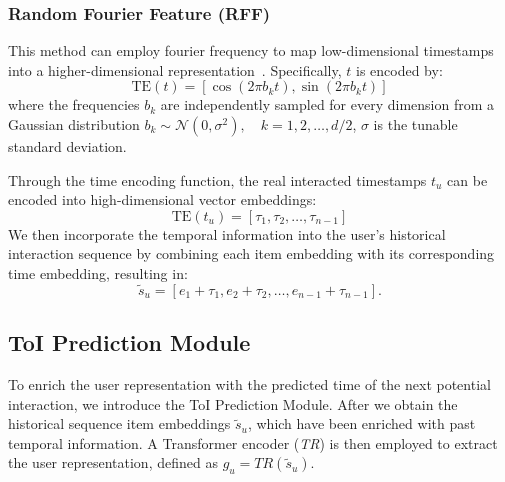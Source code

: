 \documentclass[sigconf,nonacm]{acmart}
\begin{document}
\subsubsection{Random Fourier Feature (RFF)}
This method can employ fourier frequency to map low-dimensional timestamps into a higher-dimensional representation~\cite{zheng2021rethinking}. Specifically, \( t \) is encoded by:
\begin{equation}
\mathrm{TE}(t) = \left[ \cos\left(2\pi b_k t\right), \sin\left(2\pi b_k t\right) \right]
\end{equation}
where the frequencies \( b_k \) are independently sampled for every dimension from a Gaussian distribution \(b_k \sim \mathcal{N}(0, \sigma^2), \quad k = 1, 2, \dots, d/2\), \( \sigma \) is the tunable standard deviation. 

Through the time encoding function, the real interacted timestamps \({{t}}_u\) can be encoded into high-dimensional vector embeddings:
\begin{equation}
\text{TE}({{t}}_u) = [{\tau}_1, {\tau}_2, \dots, {\tau}_{n-1}]
\end{equation}
We then incorporate the temporal information into the user's historical interaction sequence by combining each item embedding with its corresponding time embedding, resulting in:
\begin{equation}
\tilde{{s}}_u = [e_1 + {\tau}_1, e_2 + {\tau}_2, \dots, e_{n-1} + {\tau}_{n-1}].
\end{equation}




\subsection{ToI Prediction Module}
\label{subsec:TPM}
To enrich the user representation with the predicted time of the next potential interaction, we introduce the ToI Prediction Module. After we obtain the historical sequence item embeddings \(\tilde{{s}}_u\), which have been enriched with past temporal information. A Transformer encoder (\textit{TR}) is then employed to extract the user representation, defined as \( {g}_u = \textit{TR}(\tilde{{s}}_u) \).
\end{document}

